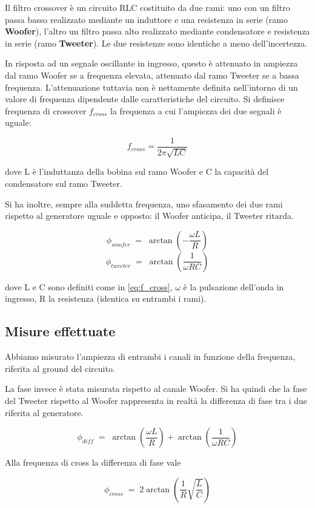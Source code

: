 \documentclass[../Relazione_circuiti]{subfiles}
\begin{document}
Il filtro crossover è un circuito RLC costituito da due rami: uno con un filtro passa basso realizzato mediante un
induttore e una resistenza in serie (ramo \textbf{Woofer}), l'altro un filtro passa alto realizzato mediante
condensatore e resistenza in serie (ramo \textbf{Tweeter}). Le due resistenze sono identiche a meno dell'incertezza.

In risposta ad un segnale oscillante in ingresso, questo è attenuato in ampiezza dal ramo Woofer se a frequenza elevata,
attenuato dal ramo Tweeter se a bassa frequenza. L'attenuazione tuttavia non è nettamente definita nell'intorno di un
valore di frequenza dipendente dalle caratteristiche del circuito. Si definisce frequenza di crossover $f_{cross}$ la
frequenza a cui l'ampiezza dei due segnali è uguale:

\begin{equation}\label{eq:f_cross}
  f_{cross} = \frac{1}{2 \pi \sqrt{LC} }
\end{equation}

dove L è l'induttanza della bobina sul ramo Woofer e C la capacità del condensatore sul ramo Tweeter.

Si ha inoltre, sempre alla suddetta frequenza, uno sfasamento dei due rami rispetto al generatore uguale e opposto: il
Woofer anticipa, il Tweeter ritarda.

\begin{equation}
  \label{eq:p_woofer}
  \phi_{woofer} \; = \; \arctan(-\frac{\omega L}{R})
\end{equation}
\begin{equation}
  \label{eq:p_tweeter}
  \phi_{tweeter} \; = \; \arctan(\frac{1}{\omega RC})
\end{equation}

dove L e C sono definiti come in \eqref{eq:f_cross}, $\omega$ è la pulsazione dell'onda in ingresso, R la resistenza
(identica su entrambi i rami).

\subsection{Misure effettuate}
  Abbiamo misurato l'ampiezza di entrambi i canali in funzione della frequenza, riferita al ground del circuito.

  La fase invece è stata misurata rispetto al canale Woofer. Si ha quindi che la fase del Tweeter rispetto al Woofer
  rappresenta in realtà la differenza di fase tra i due riferita al generatore.

  \begin{equation}
    \label{eq:p_diff}
    \phi_{diff} \; = \; \arctan(\frac{\omega L}{R}) + \arctan(\frac{1}{\omega RC})
  \end{equation}

  Alla frequenza di cross la differenza di fase vale

  \begin{equation}
    \label{eq:p_diff_cross}
    \phi_{cross} \; = \; 2 \arctan(\frac{1}{R} \sqrt{\frac{L}{C}})
  \end{equation}
\end{document}
